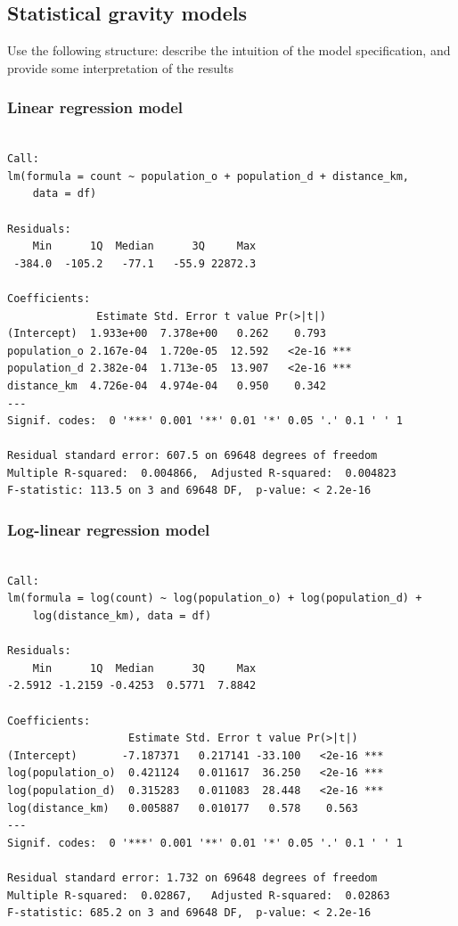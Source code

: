 \documentclass[
  a4paper, 
  twoside,
  final
]{article}
\newcounter{code}
\begin{document}
\subsection{Statistical gravity
models}\label{statistical-gravity-models}

Use the following structure: describe the intuition of the model
specification, and provide some interpretation of the results

\subsubsection{Linear regression model}\label{linear-regression-model}

\begin{verbatim}

Call:
lm(formula = count ~ population_o + population_d + distance_km, 
    data = df)

Residuals:
    Min      1Q  Median      3Q     Max 
 -384.0  -105.2   -77.1   -55.9 22872.3 

Coefficients:
              Estimate Std. Error t value Pr(>|t|)    
(Intercept)  1.933e+00  7.378e+00   0.262    0.793    
population_o 2.167e-04  1.720e-05  12.592   <2e-16 ***
population_d 2.382e-04  1.713e-05  13.907   <2e-16 ***
distance_km  4.726e-04  4.974e-04   0.950    0.342    
---
Signif. codes:  0 '***' 0.001 '**' 0.01 '*' 0.05 '.' 0.1 ' ' 1

Residual standard error: 607.5 on 69648 degrees of freedom
Multiple R-squared:  0.004866,  Adjusted R-squared:  0.004823 
F-statistic: 113.5 on 3 and 69648 DF,  p-value: < 2.2e-16
\end{verbatim}

\subsubsection{Log-linear regression
model}\label{log-linear-regression-model}

\begin{verbatim}

Call:
lm(formula = log(count) ~ log(population_o) + log(population_d) + 
    log(distance_km), data = df)

Residuals:
    Min      1Q  Median      3Q     Max 
-2.5912 -1.2159 -0.4253  0.5771  7.8842 

Coefficients:
                   Estimate Std. Error t value Pr(>|t|)    
(Intercept)       -7.187371   0.217141 -33.100   <2e-16 ***
log(population_o)  0.421124   0.011617  36.250   <2e-16 ***
log(population_d)  0.315283   0.011083  28.448   <2e-16 ***
log(distance_km)   0.005887   0.010177   0.578    0.563    
---
Signif. codes:  0 '***' 0.001 '**' 0.01 '*' 0.05 '.' 0.1 ' ' 1

Residual standard error: 1.732 on 69648 degrees of freedom
Multiple R-squared:  0.02867,   Adjusted R-squared:  0.02863 
F-statistic: 685.2 on 3 and 69648 DF,  p-value: < 2.2e-16
\end{verbatim}
\end{document}
